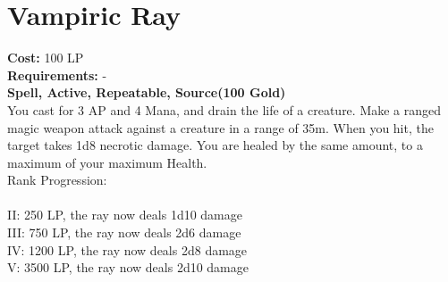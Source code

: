\section{Vampiric Ray}\label{spell:vampiricRay}
\textbf{Cost:} 100 LP\\
\textbf{Requirements:} -\\
\textbf{Spell, Active, Repeatable, Source(100 Gold)}\\
You cast for 3 AP and 4 Mana, and drain the life of a creature.
Make a ranged magic weapon attack against a creature in a range of 35m.
When you hit, the target takes 1d8 necrotic damage.
You are healed by the same amount, to a maximum of your maximum Health.
\\
Rank Progression:\\
\\
II: 250 LP, the ray now deals 1d10 damage\\
III: 750 LP, the ray now deals 2d6 damage\\
IV: 1200 LP, the ray now deals 2d8 damage\\
V: 3500 LP, the ray now deals 2d10 damage\\